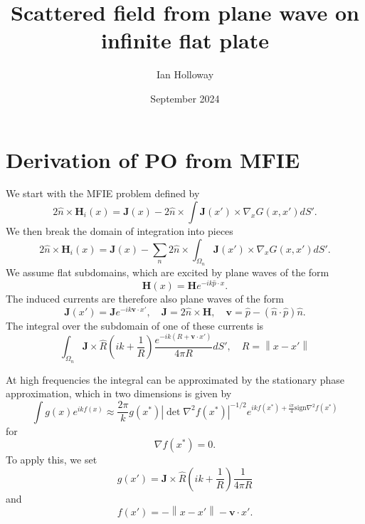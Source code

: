 \documentclass{article}
\title{Scattered field from plane wave on infinite flat plate}
\author{Ian Holloway}
\date{September 2024}
\newcommand{\norm}[1]{\left\lVert #1 \right\rVert}
\newcommand{\abs}[1]{\left\lvert #1 \right\rvert}
\theoremstyle{plain}
\begin{document}
\maketitle


\section{Derivation of PO from MFIE}

We start with the MFIE problem defined by
\begin{equation}
	2\hat{n}\times\mathbf{H}_i(x)
	= \mathbf{J}(x)
	- 2\hat{n}\times\int \mathbf{J}(x') \times \nabla_{x} G(x,x') dS'.
\end{equation}
We then break the domain of integration into pieces
\begin{equation}
	2\hat{n}\times\mathbf{H}_i(x)
	= \mathbf{J}(x)
	- \sum_n 2\hat{n}\times\int_{\Omega_n} \mathbf{J}(x') \times \nabla_{x} G(x,x') dS'.
\end{equation}
We assume flat subdomains, which are excited by plane waves of the form
\begin{equation}
	\mathbf{H}(x) = \mathbf{H}e^{-ik \hat{p} \cdot x}.
\end{equation}
The induced currents are therefore also plane waves of the form
\begin{equation}
	\mathbf{J}(x') = \mathbf{J}e^{-ik \mathbf{v} \cdot x'},
	\quad \mathbf{J} = 2\hat{n}\times\mathbf{H},
	\quad \mathbf{v} = \hat{p} - \left( \hat{n}\cdot\hat{p} \right)\hat{n}.
\end{equation}
The integral over the subdomain of one of these currents is
\begin{equation}
	\int_{\Omega_n}
	\mathbf{J} \times \hat{R}
	\left( ik + \frac{1}{R} \right)
	\frac{e^{-ik\left(R + \mathbf{v} \cdot x'\right)}}{4\pi R} dS',
	\quad R = \norm{x-x'}
\end{equation}



At high frequencies the integral can be approximated by the stationary phase approximation,
which in two dimensions is given by
\begin{equation}
	\int g(x) e^{ikf(x)}
	\approx \frac{2\pi}{k} g(x^*)
	\abs{\det \nabla^2 f(x^*)}^{-1/2}
	e^{ikf(x^*) + \frac{i\pi}{4}\text{sign}\nabla^2 f(x^*)}
\end{equation}
for
\begin{equation}
	\nabla f(x^*) = 0.
\end{equation}
To apply this, we set
\begin{equation}
	g(x') = 
	\mathbf{J} \times \hat{R}
	\left( ik + \frac{1}{R} \right)
	\frac{1}{4\pi R}
\end{equation}
and
\begin{equation}
	f(x') = -\norm{x-x'} - \mathbf{v}\cdot x'.
\end{equation}
\end{document}
